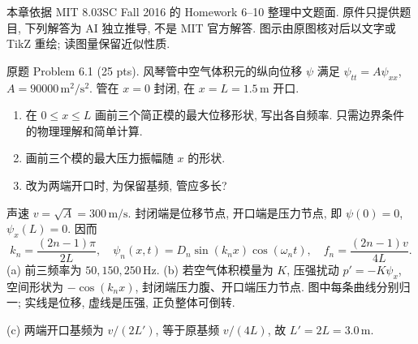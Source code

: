 本章依据 MIT 8.03SC Fall 2016 的 Homework 6--10 整理中文题面. 原件只提供题目, 下列解答为 AI 独立推导, 不是 MIT 官方解答. 图示由原图核对后以文字或 TikZ 重绘; 读图量保留近似性质.

\begin{exercise}\label{ps:6.1}
原题 Problem 6.1 (25 pts). 风琴管中空气体积元的纵向位移 $\psi$ 满足 $\psi_{tt}=A\psi_{xx}$, $A=90000\,\mathrm{m^2/s^2}$. 管在 $x=0$ 封闭, 在 $x=L=1.5\,\mathrm m$ 开口.
\begin{enumerate}[label=\alph*.]
\item 在 $0\le x\le L$ 画前三个简正模的最大位移形状, 写出各自频率. 只需边界条件的物理理解和简单计算.
\item 画前三个模的最大压力振幅随 $x$ 的形状.
\item 改为两端开口时, 为保留基频, 管应多长?
\end{enumerate}
\end{exercise}
\begin{solution}
声速 $v=\sqrt A=300\,\mathrm{m/s}$. 封闭端是位移节点, 开口端是压力节点, 即 $\psi(0)=0$, $\psi_x(L)=0$. 因而
\[
 k_n=\frac{(2n-1)\pi}{2L},\quad \psi_n(x,t)=D_n\sin(k_nx)\cos(\omega_nt),\quad
 f_n=\frac{(2n-1)v}{4L}.
\]
(a) 前三频率为 $50,150,250\,\mathrm{Hz}$. (b) 若空气体积模量为 $K$, 压强扰动 $p'=-K\psi_x$, 空间形状为 $-\cos(k_nx)$, 封闭端压力腹、开口端压力节点. 图中每条曲线分别归一; 实线是位移, 虚线是压强, 正负整体可倒转.
\begin{center}\end{center}
(c) 两端开口基频为 $v/(2L')$, 等于原基频 $v/(4L)$, 故 $L'=2L=3.0\,\mathrm m$.
\end{solution}

